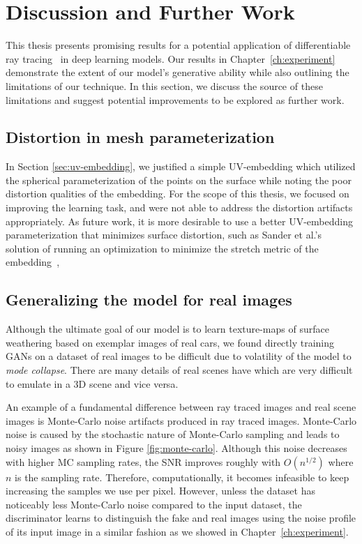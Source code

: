\chapter{Discussion and Further Work}

This thesis presents promising results for a potential application of differentiable ray
tracing~\cite{li2018differentiable} in deep learning models. Our results in
Chapter~\ref{ch:experiment} demonstrate the extent of our model's generative ability while also
outlining the limitations of our technique. In this section, we discuss the source of these
limitations and suggest potential improvements to be explored as further work.

\section{Distortion in mesh parameterization} \label{sec:distortion}

In Section \ref{sec:uv-embedding}, we justified a simple UV-embedding which utilized the
spherical parameterization of the points on the surface while noting the poor distortion
qualities of the embedding. For the scope of this thesis, we focused on improving the
learning task, and were not able to address the distortion artifacts appropriately. As
future work, it is more desirable to use a better UV-embedding parameterization that
minimizes surface distortion, such as Sander et al.'s solution of running an optimization
to minimize the stretch metric of the embedding~\cite{sander2001texture},

\section{Generalizing the model for real images}

Although the ultimate goal of our model is to learn texture-maps of surface weathering based
on exemplar images of real cars, we found directly training GANs on a dataset of real
images to be difficult due to volatility of the model to \emph{mode collapse}. There are many
details of real scenes have which are very difficult to emulate in a 3D scene and vice versa.

An example of a fundamental difference between ray traced images and real scene images is
Monte-Carlo noise artifacts produced in ray traced images. Monte-Carlo noise is caused by the
stochastic nature of Monte-Carlo sampling and leads to noisy images as shown in Figure
\ref{fig:monte-carlo}. Although this noise decreases with higher MC sampling rates, the SNR improves
roughly with $O(n^{1/2})$ where $n$ is the sampling rate. Therefore, computationally, it
becomes infeasible to keep increasing the samples we use per pixel. However, unless the
dataset has noticeably less Monte-Carlo noise compared to the input dataset, the discriminator
learns to distinguish the fake and real images using the noise profile of its input image in a
similar fashion as we showed in Chapter~\ref{ch:experiment}.

